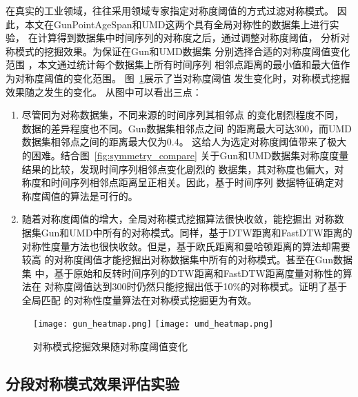 在真实的工业领域，往往采用领域专家指定对称度阈值的方式过滤对称模式。
因此，本文在GunPointAgeSpan和UMD这两个具有全局对称性的数据集上进行实验，
在计算得到数据集中时间序列的对称度之后，通过调整对称度阈值，
分析对称模式的挖掘效果。为保证在Gun和UMD数据集
分别选择合适的对称度阈值变化范围
，本文通过统计每个数据集上所有时间序列
相邻点距离的最小值和最大值作为对称度阈值的变化范围。
图~\ref{fig:symmetry_heatmap}展示了当对称度阈值
发生变化时，对称模式挖掘效果随之发生的变化。
从图中可以看出三点：
\begin{enumerate}
  \item 尽管同为对称数据集，不同来源的时间序列其相邻点
  的变化剧烈程度不同，数据的差异程度也不同。Gun数据集相邻点之间
  的距离最大可达300，而UMD数据集相邻点之间的距离最大仅为0.4。
  这给人为选定对称度阈值带来了极大的困难。结合图~\ref{fig:symmetry_compare}
  关于Gun和UMD数据集对称度度量结果的比较，发现时间序列相邻点变化剧烈的
  数据集，其对称度也偏大，对称度和时间序列相邻点距离呈正相关。因此，基于时间序列
  数据特征确定对称度阈值的算法是可行的。
  \item 随着对称度阈值的增大，全局对称模式挖掘算法很快收敛，能挖掘出
  对称数据集Gun和UMD中所有的对称模式。同样，基于DTW距离和FastDTW距离的
  对称性度量方法也很快收敛。但是，基于欧氏距离和曼哈顿距离的算法却需要较高
  的对称度阈值才能挖掘出对称数据集中所有的对称模式。甚至在Gun数据集
  中，基于原始和反转时间序列的DTW距离和FastDTW距离度量对称性的算法在
  对称度阈值达到300时仍然只能挖掘出低于10\%的对称模式。证明了基于全局匹配
  的对称性度量算法在对称模式挖掘更为有效。

\end{enumerate}
\begin{figure}
  \centering
  {\texttt{[image: gun\_heatmap.png]}}
  {\texttt{[image: umd\_heatmap.png]}}
  \caption{对称模式挖掘效果随对称度阈值变化}
  \label{fig:symmetry_heatmap}
\end{figure}

\subsection{分段对称模式效果评估实验}


